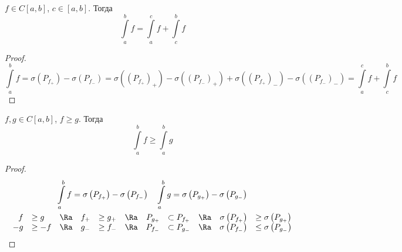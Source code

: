 \begin{theorem}
	$f \in C[a, b]$, $c \in [a, b]$.
	Тогда
	\[ \int\limits_a^b f = \int\limits_a^c f + \int\limits_c^b f \]
\end{theorem}
\begin{proof}
	\[
		\int\limits_a^b f = \sigma\left(P_{f_+}\right) - \sigma\left(P_{f_-}\right) =
			\sigma\left(\left(P_{f_+}\right)_+\right) - \sigma \left(\left(P_{f_-}\right)_+\right) + \sigma \left(\left(P_{f_+}\right)_-\right) - \sigma \left(\left(P_{f_-}\right)_-\right) =
			\int\limits_a^c f + \int\limits_c^b f
	\]
\end{proof}

\begin{theorem}
	$f, g \in C[a, b]$, $f \ge g$.
	Тогда
	\[ \int\limits_a^b f \ge \int\limits_a^b g \]
\end{theorem}
\begin{proof}
	\begin{gather*}
		\int\limits_a^b f = \sigma\left(P_{f_+}\right) - \sigma\left(P_{f_-}\right) \quad
		\int\limits_a^b g = \sigma\left(P_{g_+}\right) - \sigma\left(P_{g_-}\right) \\
		\begin{array}{rlcrlcrlcrl}
			 f &\ge  g &\Ra& f_+ &\ge g_+ &\Ra& P_{g_+} &\subset P_{f_+} &\Ra& \sigma\left(P_{f_+}\right) &\ge \sigma\left(P_{g_+}\right) \\
			-g &\ge -f &\Ra& g_- &\ge f_- &\Ra& P_{f_-} &\subset P_{g_-} &\Ra& \sigma\left(P_{f_-}\right) &\le \sigma\left(P_{g_-}\right)
		\end{array}
	\end{gather*}
\end{proof}
